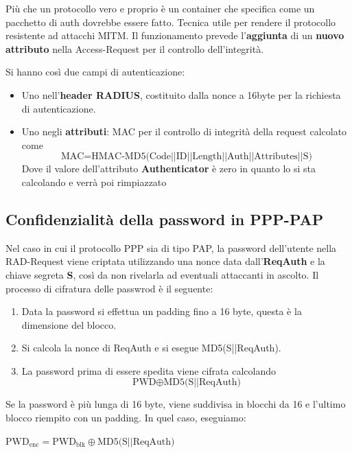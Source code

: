 \begin{theorem}
Più che un protocollo vero e proprio è un container che specifica come un pacchetto di auth dovrebbe essere fatto. 
Tecnica utile per rendere il protocollo resistente ad attacchi MITM. Il funzionamento prevede l'\textbf{aggiunta} di un \textbf{nuovo attributo} nella Access-Request per il controllo dell'integrità.
\end{theorem}
Si hanno così due campi di autenticazione:
\begin{itemize}
    \item Uno nell'\textbf{header RADIUS}, costituito dalla nonce a 16byte per la richiesta di autenticazione.
    \item Uno negli \textbf{attributi}: MAC per il controllo di integrità della request calcolato come
    \[\text{MAC}=\text{HMAC-MD5(Code||ID||Length||Auth||Attributes||S)}\]
    Dove il valore dell'attributo \textbf{Authenticator} è zero in quanto lo si sta calcolando e verrà poi rimpiazzato
\end{itemize}
\subsection{Confidenzialità della password in PPP-PAP}
Nel caso in cui il protocollo PPP sia di tipo PAP, la password dell'utente nella RAD-Request viene criptata utilizzando una nonce data dall'\textbf{ReqAuth} e la chiave segreta \textbf{S}, così da non rivelarla ad eventuali attaccanti in ascolto. Il processo di cifratura delle passwrod è il seguente: 
\begin{definition}
\begin{enumerate}
    \item Data la password si effettua un padding fino a 16 byte, questa è la dimensione del blocco.
    \item Si calcola la nonce di ReqAuth e si esegue MD5(S||ReqAuth). 
    \item La password prima di essere spedita viene cifrata calcolando 
    \[\text{PWD}\oplus\text{MD5(S||ReqAuth)}\]
\end{enumerate}
Se la password è più lunga di 16 byte, viene suddivisa in blocchi da 16 e l'ultimo blocco riempito con un padding. In quel caso, eseguiamo:
\begin{algorithmic}
\State $\text{PWD}_{\text{enc}}=\text{PWD}_{\text{blk}}\oplus\text{MD5(S||ReqAuth)}$
\EndFor
\end{algorithmic}
\end{definition}

